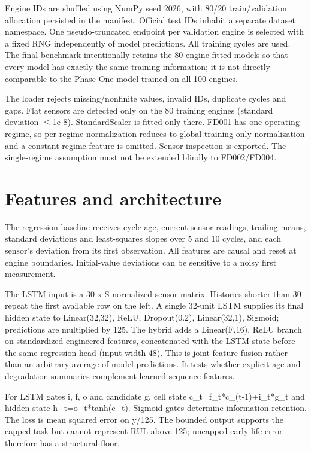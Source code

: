 \documentclass[conference]{IEEEtran}
\begin{document}
Engine IDs are shuffled using NumPy seed 2026, with 80/20 train/validation allocation persisted in the manifest. Official test IDs inhabit a separate dataset namespace. One pseudo-truncated endpoint per validation engine is selected with a fixed RNG independently of model predictions. All training cycles are used. The final benchmark intentionally retains the 80-engine fitted models so that every model has exactly the same training information; it is not directly comparable to the Phase One model trained on all 100 engines.

The loader rejects missing/nonfinite values, invalid IDs, duplicate cycles and gaps. Flat sensors are detected only on the 80 training engines (standard deviation $\leq$1e-8). StandardScaler is fitted only there. FD001 has one operating regime, so per-regime normalization reduces to global training-only normalization and a constant regime feature is omitted. Sensor inspection is exported. The single-regime assumption must not be extended blindly to FD002/FD004.

\section{Features and architecture}

The regression baseline receives cycle age, current sensor readings, trailing means, standard deviations and least-squares slopes over 5 and 10 cycles, and each sensor's deviation from its first observation. All features are causal and reset at engine boundaries. Initial-value deviations can be sensitive to a noisy first measurement.

The LSTM input is a 30 x S normalized sensor matrix. Histories shorter than 30 repeat the first available row on the left. A single 32-unit LSTM supplies its final hidden state to Linear(32,32), ReLU, Dropout(0.2), Linear(32,1), Sigmoid; predictions are multiplied by 125. The hybrid adds a Linear(F,16), ReLU branch on standardized engineered features, concatenated with the LSTM state before the same regression head (input width 48). This is joint feature fusion rather than an arbitrary average of model predictions. It tests whether explicit age and degradation summaries complement learned sequence features.

For LSTM gates i, f, o and candidate g, cell state c\_t=f\_t*c\_(t-1)+i\_t*g\_t and hidden state h\_t=o\_t*tanh(c\_t). Sigmoid gates determine information retention. The loss is mean squared error on y/125. The bounded output supports the capped task but cannot represent RUL above 125; uncapped early-life error therefore has a structural floor.
\end{document}
